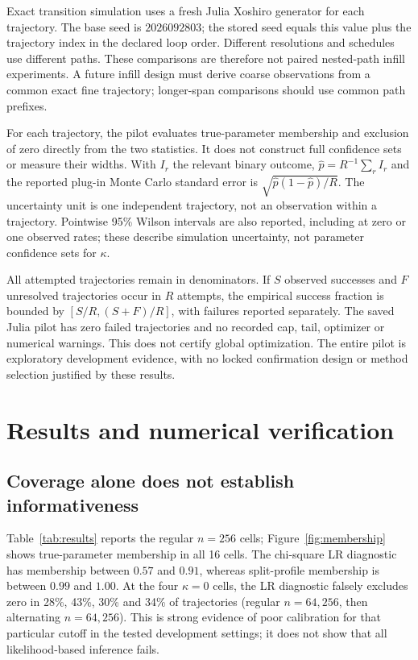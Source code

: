 \documentclass[11pt]{article}
\begin{document}
Exact transition simulation uses a fresh Julia Xoshiro generator for each
trajectory. The base seed is $2026092803$; the stored seed equals this value
plus the trajectory index in the declared loop order. Different resolutions
and schedules use different paths. These comparisons are therefore not paired
nested-path infill experiments. A future infill design must derive coarse
observations from a common exact fine trajectory; longer-span comparisons
should use common path prefixes.

For each trajectory, the pilot evaluates true-parameter membership and exclusion
of zero directly from the two statistics. It does not construct full confidence
sets or measure their widths. With $I_r$ the relevant binary outcome,
$\widehat p=R^{-1}\sum_r I_r$ and the reported plug-in Monte Carlo standard
error is $\sqrt{\widehat p(1-\widehat p)/R}$. The uncertainty unit is one
independent trajectory, not an observation within a trajectory. Pointwise 95\%
Wilson intervals are also reported, including at zero or one observed rates;
these describe simulation uncertainty, not parameter confidence sets for $\kappa$.

All attempted trajectories remain in denominators. If $S$ observed successes and
$F$ unresolved trajectories occur in $R$ attempts, the empirical success fraction
is bounded by $[S/R,(S+F)/R]$, with failures reported separately. The saved Julia
pilot has zero failed trajectories and no recorded cap, tail, optimizer or
numerical warnings. This does not certify global optimization. The entire pilot
is exploratory development evidence, with no locked confirmation design or
method selection justified by these results.

\section{Results and numerical verification}
\subsection{Coverage alone does not establish informativeness}
Table~\ref{tab:results} reports the regular $n=256$ cells; Figure~\ref{fig:membership}
shows true-parameter membership in all 16 cells. The chi-square LR diagnostic
has membership between $0.57$ and $0.91$, whereas split-profile membership is
between $0.99$ and $1.00$. At the four $\kappa=0$ cells, the LR diagnostic falsely
excludes zero in 28\%, 43\%, 30\% and 34\% of trajectories (regular $n=64,256$,
then alternating $n=64,256$). This is strong evidence of poor calibration for
that particular cutoff in the tested development settings; it does not show
that all likelihood-based inference fails.
\end{document}
